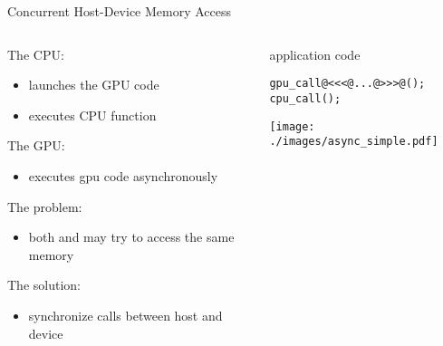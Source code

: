 \documentclass[aspectratio=43]{beamer}
\begin{document}
\begin{frame}[fragile]{Concurrent Host-Device Memory Access}
    \begin{columns}[T]
        \begin{column}{0.6\textwidth}
                The CPU:
                \begin{itemize}
                    \item launches the GPU code 
                    \item executes CPU function 
                \end{itemize}
                The GPU:
                \begin{itemize}
                    \item executes gpu code asynchronously
                \end{itemize}
                The problem:
                \begin{itemize}
                    \item both  and  may try to access the same memory
                \end{itemize}
                The solution:
                \begin{itemize}
                    \item synchronize calls between host and device
                \end{itemize}
        \end{column}
        \begin{column}{0.4\textwidth}
            \begin{codecolumn}{application code}
                \begin{lstlisting}[style=boxcudatiny]
gpu_call@<<<@...@>>>@();
cpu_call();
                \end{lstlisting}
            \end{codecolumn}
            \texttt{[image: ./images/async\_simple.pdf]}
        \end{column}
    \end{columns}
\end{frame}
\end{document}
